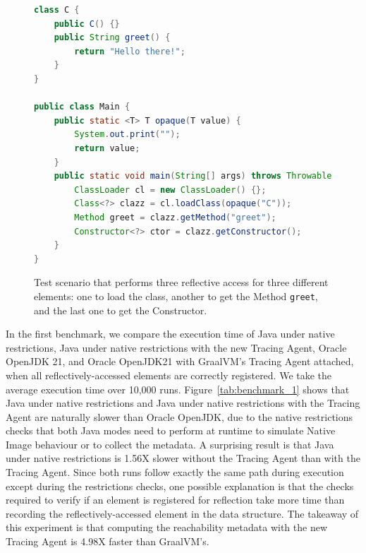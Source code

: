 \begin{figure}[ht]
    \centering
\begin{lstlisting}[language=Java]
class C {
    public C() {}
    public String greet() {
        return "Hello there!";
    }
}

public class Main {
    public static <T> T opaque(T value) {
        System.out.print("");
        return value;
    }
    public static void main(String[] args) throws Throwable {
        ClassLoader cl = new ClassLoader() {};
        Class<?> clazz = cl.loadClass(opaque("C"));
        Method greet = clazz.getMethod("greet");
        Constructor<?> ctor = clazz.getConstructor();
    }
}
\end{lstlisting}
    \caption{Test scenario that performs three reflective access for three different elements: one to load the class, another to get the Method \texttt{greet}, and the last one to get the Constructor.}
    \label{fig:benchmark}
\end{figure}

In the first benchmark, we compare the execution time of Java under native restrictions, Java under native restrictions with the new Tracing Agent, Oracle OpenJDK 21, and Oracle OpenJDK21 with GraalVM's Tracing Agent attached, when all reflectively-accessed elements are correctly registered. We take the average execution time over 10,000 runs.
Figure~\ref{tab:benchmark_1} shows that Java under native restrictions and Java under native restrictions with the Tracing Agent are naturally slower than Oracle OpenJDK, due to the native restrictions checks that both Java modes need to perform at runtime to simulate Native Image behaviour or to collect the metadata. 
A surprising result is that Java under native restrictions is 1.56X slower without the Tracing Agent than with the Tracing Agent. Since both runs follow exactly the same path during execution except during the restrictions checks, one possible explanation is that the checks required to verify if an element is registered for reflection take more time than recording the reflectively-accessed element in the data structure. The takeaway of this experiment is that computing the reachability metadata with the new Tracing Agent is 4.98X faster than GraalVM's.

